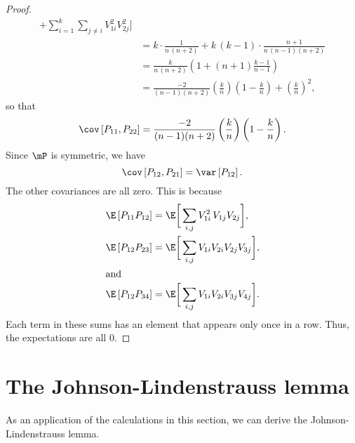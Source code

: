 \begin{proof}
\begin{align*}
                  + \sum_{i=1}^k
                    \sum_{j\neq i} V_{1i}^2 V_{2j}^2
              \bigg] \\
        &= k \cdot \frac{1}{ n \, (n+2) }
           + k \, (k-1) \cdot \frac{ n+1 }{ n \, (n-1) (n+2) } \\
        &= \frac{k}{ n \, (n+2) }
           \left( 1 + (n+1) \frac{k-1}{n-1} \right) \\
        &= \frac{-2}{(n-1)(n+2)}
           \left(\frac{k}{n}\right) \left( 1 - \frac{k}{n} \right)
           + \left( \frac{k}{n} \right)^2,
    \end{align*}
    so that
    \[
        \cov \left[ P_{11}, P_{22} \right]
        = \frac{-2}{ (n-1) (n+2) }
           \left(\frac{k}{n}\right) \left( 1 - \frac{k}{n} \right).
    \]
    Since $\mP$ is symmetric, we have
    \[
        \cov \left[ P_{12}, P_{21} \right]
        = \var \left[ P_{12} \right].
    \]
    The other covariances are all zero.  This is because
    \begin{align*}
        \E \left[ P_{11} P_{12} \right]
        &= \E \bigg[ 
                  \sum_{i,j} V_{1i}^2 \, V_{1j}  V_{2j} 
              \bigg], \\
        \E \left[ P_{12} P_{23} \right]
        &= \E \bigg[ 
                \sum_{i,j} V_{1i} V_{2i} V_{2j} V_{3j}
              \bigg], \\
    \intertext{and}
        \E \left[ P_{12} P_{34} \right]
        &= \E \bigg[ 
                \sum_{i,j} V_{1i} V_{2i} V_{3j} V_{4j}
              \bigg].
    \end{align*}
    Each term in these sums has an element that appears only once in a row.
    Thus, the expectations are all $0$.
\end{proof}


\section{The Johnson-Lindenstrauss lemma}

As an application of the calculations in this section, we can derive the
Johnson-Lindenstrauss lemma.

